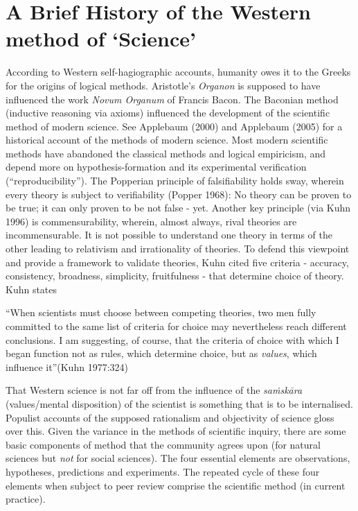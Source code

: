 \section*{A Brief History of the Western method of `Science'}

According to Western self-hagiographic accounts, humanity owes it to the Greeks for the origins of logical methods. Aristotle's {\sl Organon} is supposed to have influenced the work {\sl Novum Organum} of Francis Bacon.  The Baconian method (inductive reasoning via axioms) influenced the development of the scientific method of modern science. See Applebaum (2000) and Applebaum (2005) for a historical account of the methods of modern science. Most modern scientific methods have abandoned the classical methods and logical empiricism, and depend more on hypothesis-formation and its experimental verification (``reproducibility''). The Popperian principle of falsifiability holds sway, wherein every theory is subject to verifiability (Popper 1968): No theory can be proven to be true; it can only proven to be not false - yet.  Another key principle (via Kuhn 1996) is commensurability, wherein, almost always, rival theories are incommensurable. It is not possible to understand one theory in terms of the other leading to relativism and irrationality of theories. To defend this viewpoint and provide a framework to validate theories, Kuhn cited five criteria - accuracy, consistency, broadness, simplicity, fruitfulness - that determine choice of theory. Kuhn states
\begin{myquote}
``When scientists must choose between competing theories, two men fully committed to the same list of criteria for choice may nevertheless reach different conclusions. I am suggesting, of course, that the criteria of choice with which I began function not as rules, which determine choice, but as {\sl values}, which influence it''\hfill (Kuhn 1977:324)
\end{myquote}

That Western science is not far off from the influence of the {{\sl saṁskāra}\relax} (values/mental disposition) of the scientist is something that is to be internalised. Populist accounts of the supposed rationalism and objectivity of science gloss over this. Given the variance in the methods of scientific inquiry, there are some basic components of method that the community agrees upon (for natural sciences but {\sl not} for social sciences). The four essential elements are observations, hypotheses, predictions and experiments. The repeated cycle of these four elements when subject to peer review comprise the scientific method (in current practice).

